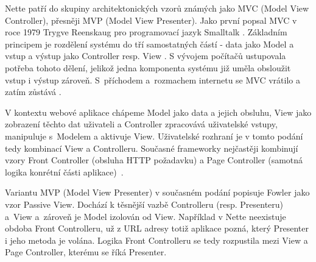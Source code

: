 Nette patří do skupiny architektonických vzorů známých jako MVC (Model View Controller), přesněji MVP (Model View Presenter). Jako první popsal MVC v roce 1979 Trygve Reenskaug pro programovací jazyk Smalltalk \cite{FowlerMVC}. Základním principem je rozdělení systému do tří samostatných částí - data jako Model a vstup a výstup jako Controller resp. View \cite{Vrana2013}. S vývojem počítačů ustupovala potřeba tohoto dělení, jelikož jedna komponenta systému již uměla obsloužit vstup i výstup zároveň. S~příchodem a~rozmachem internetu se MVC vrátilo a zatím zůstává \cite{zdrojakMVC}.

V kontextu webové aplikace chápeme Model jako data a jejich obsluhu, View jako zobrazení těchto dat uživateli a Controller zpracovává uživatelské vstupy, manipuluje s~Modelem a aktivuje View. Uživatelské rozhraní je v tomto podání tedy kombinací View a Controlleru. Současné frameworky nejčastěji kombinují vzory Front Controller (obsluha HTTP požadavku) a Page Controller (samotná logika konrétní části aplikace)~\cite{FowlerMVC}.

Variantu MVP (Model View Presenter) v současném podání popisuje Fowler \cite{FowlerPassiveView} jako vzor Passive View. Dochází k těsnější vazbě Controlleru (resp. Presenteru) a~View a~zároveň je Model izolován od View. Například v Nette neexistuje obdoba Front Controlleru, už z URL adresy totiž aplikace pozná, který Presenter i jeho metoda je volána. Logika Front Controlleru se tedy rozpustila mezi View a Page Controller, kterému se říká Presenter.